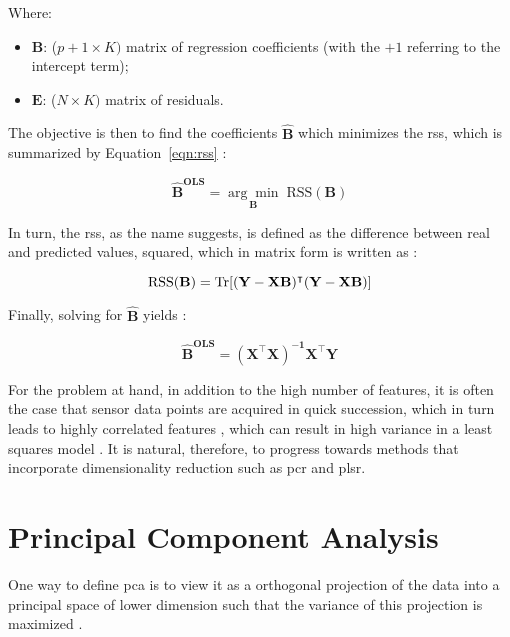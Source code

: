 Where:
\begin{itemize}
	\item $\mathbf{B}$: ($p+1 \times K)$ matrix of regression coefficients (with the $+1$ referring to the intercept term);
	\item $\mathbf{E}$: ($N \times K)$ matrix of residuals.
\end{itemize}

The objective is then to find the coefficients $\mathbf{\hat{B}}$ which minimizes the \acrfull{rss}, which is summarized by Equation~\ref{eqn:rss} \parencite{friedman2001}:

\begin{equation}
	\label{eqn:betahat}
	\mathbf{\hat{B}^\text{OLS}} = \underset{\mathbf{B}}{\arg\min} 	\; \text{RSS}(\mathbf{B})
\end{equation}

In turn, the \acrshort{rss}, as the name suggests, is defined as the difference between real and predicted values, squared, which in matrix form is written as \parencite{friedman2001}:

\begin{equation} 
	\label{eqn:rss}
	\text{RSS}(\mathbf{B}) = \operatorname{Tr} [\mathbf{(Y-XB)^\intercal (Y-XB)}]
\end{equation}

Finally, solving for $\mathbf{\hat{B}}$ yields \parencite{friedman2001}:

\begin{equation}
	\label{eqn:ols_beta}
	\mathbf{\hat{B}^\text{OLS}} = \mathbf{(X^\intercal X)^{-1} X^\intercal Y}
\end{equation}

For the problem at hand, in addition to the high number of features, it is often the case that sensor data points are acquired in quick succession, which in turn leads to highly correlated features \parencite{Bastuck_2019}, which can result in high variance in a least squares model \parencite{friedman2001}. It is natural, therefore, to progress towards methods that incorporate dimensionality reduction such as \acrfull{pcr} and \acrfull{plsr}.

\section{Principal Component Analysis}
\label{sec:pca}

One way to define \acrfull{pca} is to view it as a orthogonal projection of the data into a principal space of lower dimension such that the variance of this projection is maximized \parencite{bishop2006pattern}.


